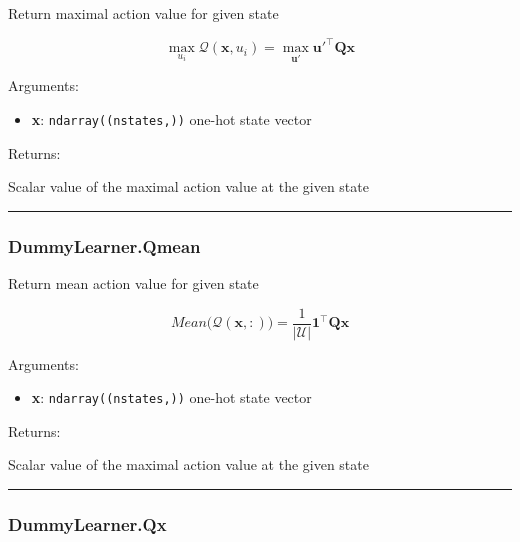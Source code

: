 Return maximal action value for given state

\[
\max_{u_i}\mathcal Q(\mathbf x, u_i) = \max_{\mathbf u'} \mathbf u'^\top \mathbf Q \mathbf x
\]

Arguments:

\begin{itemize}
\tightlist
\item
  \textbf{x}: \texttt{ndarray((nstates,))} one-hot state vector
\end{itemize}

Returns:

Scalar value of the maximal action value at the given state

\begin{center}\rule{0.5\linewidth}{\linethickness}\end{center}

\subsubsection{DummyLearner.Qmean}\label{dummylearner.qmean}

\begin{Shaded}
\begin{Highlighting}[]
\end{Highlighting}
\end{Shaded}

Return mean action value for given state

\[
Mean \big(\mathcal Q(\mathbf x, :)\big) = \frac{1}{|\mathcal U|} \mathbf 1^\top \mathbf Q \mathbf x
\]

Arguments:

\begin{itemize}
\tightlist
\item
  \textbf{x}: \texttt{ndarray((nstates,))} one-hot state vector
\end{itemize}

Returns:

Scalar value of the maximal action value at the given state

\begin{center}\rule{0.5\linewidth}{\linethickness}\end{center}

\subsubsection{DummyLearner.Qx}\label{dummylearner.qx}

